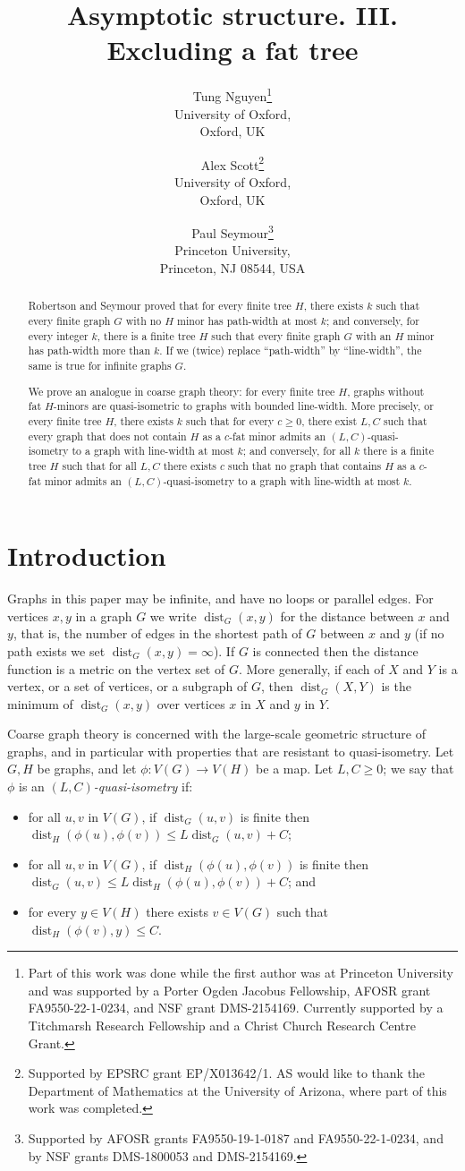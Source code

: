 \documentclass[titlepage,11pt]{article}
\title{Asymptotic structure. III\@. Excluding a fat tree}
\author{
	Tung Nguyen\thanks{Part of this work was done while the first author was at Princeton University and was supported by a Porter Ogden Jacobus Fellowship, AFOSR grant FA9550-22-1-0234, and NSF grant DMS-2154169.
		Currently supported by a Titchmarsh Research Fellowship and a Christ Church Research Centre Grant.}\\
	University of Oxford,\\ Oxford, UK
	\and
	Alex Scott\thanks{Supported by EPSRC grant EP/X013642/1.  AS would like to thank the Department of Mathematics at the University of Arizona, where part of this work was completed.}\\
	University of Oxford, \\
	Oxford, UK
	\and
	Paul Seymour\thanks{Supported by AFOSR grants
		FA9550-19-1-0187 and FA9550-22-1-0234, and by NSF grants DMS-1800053 and DMS-2154169.}\\
	Princeton University,\\ Princeton, NJ 08544, USA}
\date{
}
\newcommand{\dist}{\operatorname{dist}}
\begin{document}
	\maketitle
	\begin{abstract}
		Robertson and Seymour proved that for every finite tree $H$, there exists $k$ such that every finite graph $G$ with no $H$ minor has path-width at most $k$; and 
		conversely, for every integer $k$, there is a finite tree $H$ such that every finite graph $G$ with an $H$ minor has path-width more than $k$. If we (twice) replace 
		``path-width'' by ``line-width'', the same is true for infinite graphs $G$.
		
		We prove an analogue in coarse graph theory: for every finite tree $H$, graphs without fat $H$-minors are quasi-isometric to graphs with bounded line-width. More precisely, or every finite tree $H$, there exists $k$ such that for every $c\ge 0$, there exist $L,C$ such that every graph 
		that does not contain $H$ as a $c$-fat minor admits an $(L,C)$-quasi-isometry to a graph with line-width at most $k$; and conversely,
		for all $k$ there is a finite tree $H$ such that for all $L,C$ there exists $c$ such that no graph that contains $H$ as a $c$-fat minor admits an $(L,C)$-quasi-isometry to a graph 
		with line-width at most $k$.
	\end{abstract}
	
	\section{Introduction}
	
	
	Graphs in this paper may be infinite, and have no loops or parallel edges.  For vertices $x,y$ in a graph $G$ we write $\dist_G(x,y)$ for the distance between $x$ and $y$, that is, the number of edges in the shortest path of $G$ between $x$ and  $y$ (if no path exists we set $\dist_G(x,y) = \infty$).  If $G$ is connected then the distance function is a metric on the vertex set of $G$.  More generally, if each of $X$ and $Y$ is a vertex, or a set of vertices, or a subgraph of $G$, then $\dist_G(X,Y)$ is the minimum of $\dist_G(x,y)$ over vertices $x$ in $X$ and $y$ in $Y$.
	
	Coarse graph theory is concerned with the large-scale geometric structure of graphs, and in particular with properties that are resistant to quasi-isometry.	
	Let $G,H$ be graphs, and let $\phi:V(G)\to V(H)$ be a map.
	Let $L,C\ge 0$; we say that $\phi$ is an {\em $(L,C)$-quasi-isometry}
	if:
	\begin{itemize}
		\item for all $u,v$ in $V(G)$, if $\dist_G(u,v)$ is finite then $\dist_H(\phi(u),\phi(v))\le L \dist_G(u,v)+C$;
		\item for all $u,v$ in $V(G)$, if $\dist_H(\phi(u),\phi(v))$ is finite then $\dist_G(u,v)\le L \dist_H(\phi(u),\phi(v))+C$;
		and
		\item for every $y\in V(H)$ there exists $v\in V(G)$ such that $\dist_H(\phi(v), y)\le  C$.
	\end{itemize}
	
\end{document}
